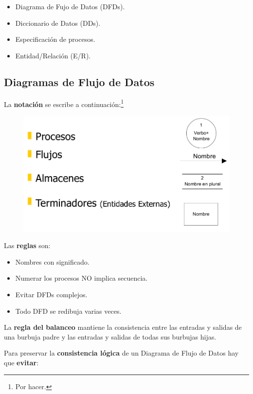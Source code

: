 \begin{itemize}[noitemsep]
\item Diagrama de Fujo de Datos (DFDs).
\item Diccionario de Datos (DDs).
\item Especificación de procesos.
\item Entidad/Relación (E/R).
\end{itemize}

\subsection{Diagramas de Flujo de Datos} %
La \textbf{notación} se escribe a continuación:\footnote{Por hacer.}

\begin{figure}[H]
  \includegraphics[width=\textwidth]{./images/dfds.png}
\end{figure}

Las \textbf{reglas} son:

\begin{itemize}[noitemsep]
\item Nombres con significado.
\item Numerar los procesos NO implica secuencia.
\item Evitar DFDs complejos.
\item Todo DFD se redibuja varias veces.
\end{itemize}

La \textbf{regla del balanceo} mantiene la consistencia entre las entradas y salidas de una burbuja padre y las entradas y salidas de todas sus burbujas hijas.

Para preservar la \textbf{consistencia lógica} de un Diagrama de Flujo de Datos hay que \textbf{evitar}:

